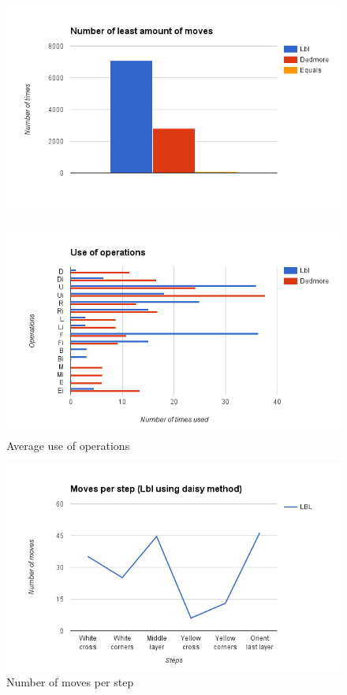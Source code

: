 \documentclass[a4paper,11pt]{kth-mag}
\begin{document}
\begin{figure}[ht!]
	\centering
	\includegraphics[width= 1.0\textwidth]{figs/graphtwo.png}
	\caption{}
	\label{fig_19}
\end{figure}
\begin{figure}[ht!]
	\centering
	\includegraphics[width= 1.0\textwidth]{figs/graphthree.png}
	\caption{Average use of operations}
	\label{fig_20}
\end{figure}
\begin{figure}[ht!]
	\centering
	\includegraphics[width= 1.0\textwidth]{figs/lbldaisysteps.png}
	\caption{Number of moves per step}
	\label{fig_21}
\end{figure}
\end{document}
